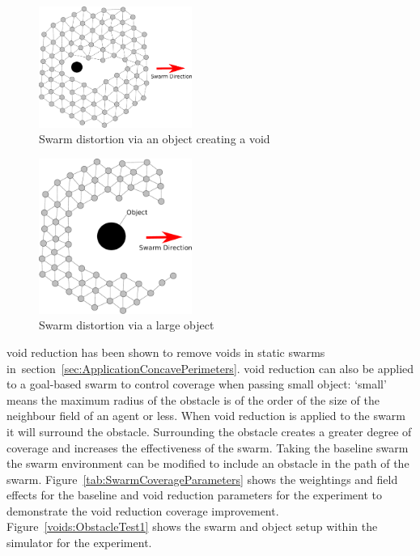 \documentclass[preprint,12pt]{elsarticle}
\begin{document}
\begin{figure}
\begin{center}
\includegraphics[width=5cm]{figures/PerimeterObject2}
\end{center}
\caption{Swarm distortion via an object creating a void\label{concave:PerimeterObject2}}
\end{figure}
\begin{figure}
\begin{center}
\includegraphics[width=5cm]{figures/PerimeterObject1}
\end{center}
\caption{Swarm distortion via a large object\label{concave:PerimeterObject1}}
\end{figure}
void reduction has been shown to remove voids in static swarms in~section~\ref{sec:ApplicationConcavePerimeters}. void reduction can also be applied to a goal-based swarm to control coverage when passing small object: `small' means the maximum radius of the obstacle is of the order of the size of the neighbour field of an agent or less. When void reduction is applied to the swarm it will surround the obstacle. Surrounding the obstacle creates a greater degree of coverage and increases the effectiveness of the swarm.
Taking the baseline swarm the swarm environment can be modified to include an obstacle in the path of the swarm. Figure~\ref{tab:SwarmCoverageParameters} shows the weightings and field effects for the baseline and void reduction parameters for the experiment to demonstrate the void reduction coverage improvement. Figure~\ref{voids:ObstacleTest1} shows the swarm and object setup within the simulator for the experiment.
\end{document}
